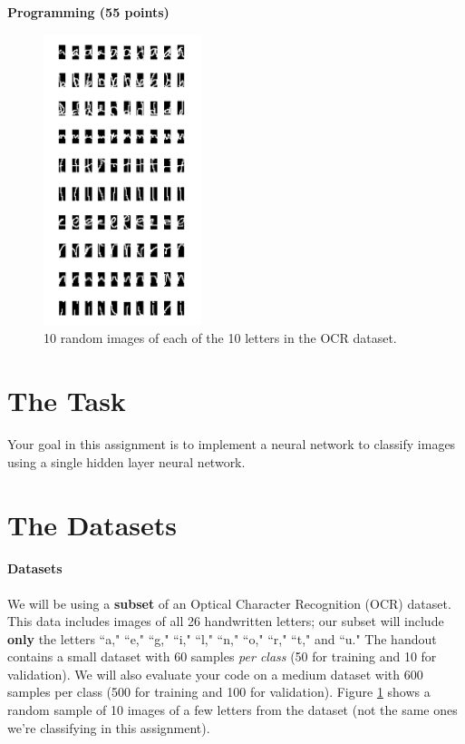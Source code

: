\documentclass[11pt,addpoints,answers]{exam}
\begin{document}
\begin{questions}
\begin{your_solution}[height=6cm]

\end{your_solution}
    \newpage
    \end{questions}
    
{\LARGE \bf Programming (55 points)}

\begin{figure}[H]
    \centering
    \captionsetup{justification=centering, margin=2cm}
    \includegraphics[width=4.6cm,height=8.5cm]{img/lettergrid.png}
    \caption{10 random images of each of the 10 letters in the OCR dataset.}
    \label{fig:grid}
\end{figure}

\section{The Task}
Your goal in this assignment is to implement a neural network to classify images using a single hidden layer neural network.

\section{The Datasets}
\label{sec:dataset}

\paragraph{Datasets} We will be using a \textbf{subset} of an Optical Character Recognition (OCR) dataset. This data includes images of all 26 handwritten letters; our subset will include \textbf{only} the letters ``a," ``e," ``g," ``i," ``l," ``n," ``o," ``r," ``t," and ``u."  The handout contains a small dataset with 60 samples \textit{per class} (50 for training and 10 for validation). We will also evaluate your code on a medium dataset with 600 samples per class (500 for training and 100 for validation). Figure \ref{fig:grid} shows a random sample of 10 images of a few letters from the dataset (not the same ones we're classifying in this assignment).
\end{document}
